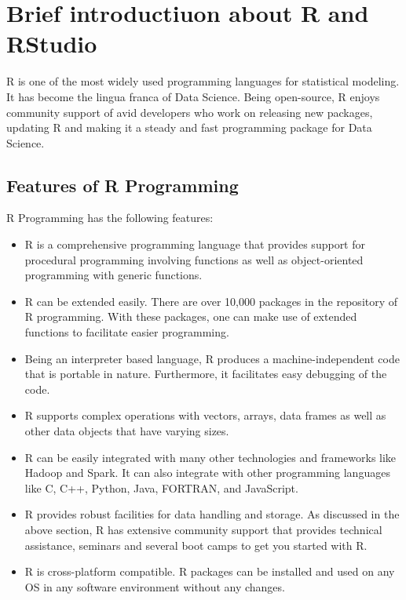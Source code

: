 \documentclass[
]{book}
\providecommand{\tightlist}{%
  \setlength{\itemsep}{0pt}\setlength{\parskip}{0pt}}
\begin{document}
\hypertarget{brief-introductiuon-about-r-and-rstudio}{%
\section{Brief introductiuon about R and RStudio}\label{brief-introductiuon-about-r-and-rstudio}}

R is one of the most widely used programming languages for statistical modeling. It has become the lingua franca of Data Science. Being open-source, R enjoys community support of avid developers who work on releasing new packages, updating R and making it a steady and fast programming package for Data Science.

\hypertarget{features-of-r-programming}{%
\subsection{Features of R Programming}\label{features-of-r-programming}}

R Programming has the following features:

\begin{itemize}
\tightlist
\item
  R is a comprehensive programming language that provides support for procedural programming involving functions as well as object-oriented programming with generic functions.
\item
  R can be extended easily. There are over 10,000 packages in the repository of R programming. With these packages, one can make use of extended functions to facilitate easier programming.
\item
  Being an interpreter based language, R produces a machine-independent code that is portable in nature. Furthermore, it facilitates easy debugging of the code.
\item
  R supports complex operations with vectors, arrays, data frames as well as other data objects that have varying sizes.
\item
  R can be easily integrated with many other technologies and frameworks like Hadoop and Spark. It can also integrate with other programming languages like C, C++, Python, Java, FORTRAN, and JavaScript.
\item
  R provides robust facilities for data handling and storage.
  As discussed in the above section, R has extensive community support that provides technical assistance, seminars and several boot camps to get you started with R.
\item
  R is cross-platform compatible. R packages can be installed and used on any OS in any software environment without any changes.
\end{itemize}
\end{document}
